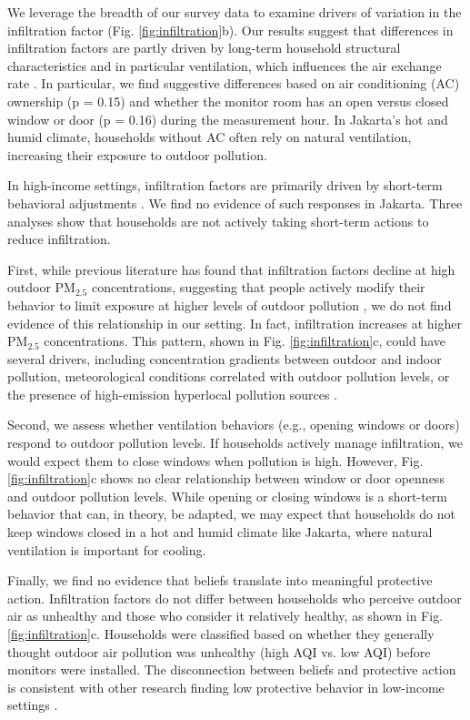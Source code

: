 \documentclass[9pt,twocolumn,twoside]{pnas-new}
\begin{document}
We leverage the breadth of our survey data to examine drivers of variation in the infiltration factor (Fig. \ref{fig:infiltration}b). 
Our results suggest that differences in infiltration factors are partly driven by long-term household structural characteristics and in particular ventilation, which influences the air exchange rate \citep{chen_review_2011}. In particular, we find suggestive differences based on air conditioning (AC) ownership (p = 0.15) and whether the monitor room has an open versus closed window or door (p = 0.16) during the measurement hour. In Jakarta’s hot and humid climate, households without AC often rely on natural ventilation, increasing their exposure to outdoor pollution.

In high-income settings, infiltration factors are primarily driven by short-term behavioral adjustments \citep{burke_exposures_2022, baquie_know_2024}. We find no evidence of such responses in Jakarta. Three analyses show that households are not actively taking short-term actions to reduce infiltration.

First, while previous literature has found that infiltration factors decline at high outdoor PM$_{2.5}$ concentrations, suggesting that people actively modify their behavior to limit exposure at higher levels of outdoor pollution \citep{burke_exposures_2022,lunderberg_assessing_2023}, we do not find evidence of this relationship in our setting. In fact, infiltration increases at higher PM$_{2.5}$ concentrations. This pattern, shown in Fig. \ref{fig:infiltration}c, could have several drivers, including concentration gradients between outdoor and indoor pollution, meteorological conditions correlated with outdoor pollution levels, or the presence of high-emission hyperlocal pollution sources \citep{lunderberg_assessing_2023,macneill_factors_2012}.

Second, we assess whether ventilation behaviors (e.g., opening windows or doors) respond to outdoor pollution levels. If households actively manage infiltration, we would expect them to close windows when pollution is high. However, Fig. \ref{fig:infiltration}c shows no clear relationship between window or door openness and outdoor pollution levels. While opening or closing windows is a short-term behavior that can, in theory, be adapted, we may expect that households do not keep windows closed in a hot and humid climate like Jakarta, where natural ventilation is important for cooling. 

Finally, we find no evidence that beliefs translate into meaningful protective action. Infiltration factors do not differ between households who perceive outdoor air as unhealthy and those who consider it relatively healthy, as shown in Fig. \ref{fig:infiltration}c. Households were classified based on whether they generally thought outdoor air pollution was unhealthy (high AQI vs. low AQI) before monitors were installed. The disconnection between beliefs and protective action is consistent with other research finding low protective behavior in low-income settings \citep{greenstone_indoor_2021, chowdhury_misbeliefs_2025}.
\end{document}
